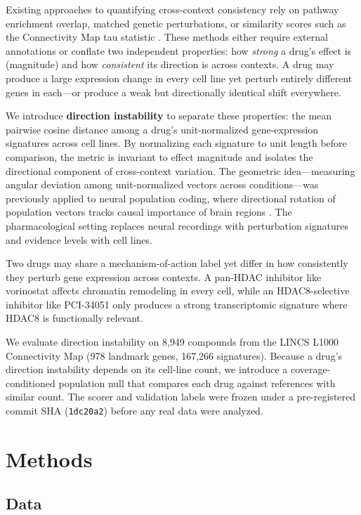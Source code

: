 \documentclass[11pt]{article}
\begin{document}
Existing approaches to quantifying cross-context consistency rely on
pathway enrichment overlap, matched genetic perturbations, or
similarity scores such as the Connectivity Map tau statistic
\citep{subramanian2017next}.  These methods either require external
annotations or conflate two independent properties: how \emph{strong}
a drug's effect is (magnitude) and how \emph{consistent} its
direction is across contexts.  A drug may produce a large expression
change in every cell line yet perturb entirely different genes in
each---or produce a weak but directionally identical shift everywhere.

We introduce \textbf{direction instability} to separate these
properties: the mean pairwise cosine distance among a drug's
unit-normalized gene-expression signatures across cell lines.  By
normalizing each signature to unit length before comparison, the metric
is invariant to effect magnitude and isolates the directional component
of cross-context variation.  The geometric idea---measuring angular
deviation among unit-normalized vectors across conditions---was
previously applied to neural population coding, where directional
rotation of population vectors tracks causal importance of brain regions
\citep{tower2026bracket}.  The pharmacological setting replaces neural
recordings with perturbation signatures and evidence levels with cell
lines.

Two drugs may share a mechanism-of-action label yet differ in how
consistently they perturb gene expression across contexts.  A pan-HDAC
inhibitor like vorinostat affects chromatin remodeling in every cell,
while an HDAC8-selective inhibitor like PCI-34051 only produces a strong
transcriptomic signature where HDAC8 is functionally relevant.

We evaluate direction instability on 8{,}949 compounds from the LINCS
L1000 Connectivity Map (978 landmark genes, 167{,}266 signatures).
Because a drug's direction instability depends on its cell-line count,
we introduce a coverage-conditioned population null that compares each
drug against references with similar count.  The scorer and validation
labels were frozen under a pre-registered commit SHA (\texttt{1dc20a2})
before any real data were analyzed.

\section{Methods}

\subsection{Data}
\end{document}
